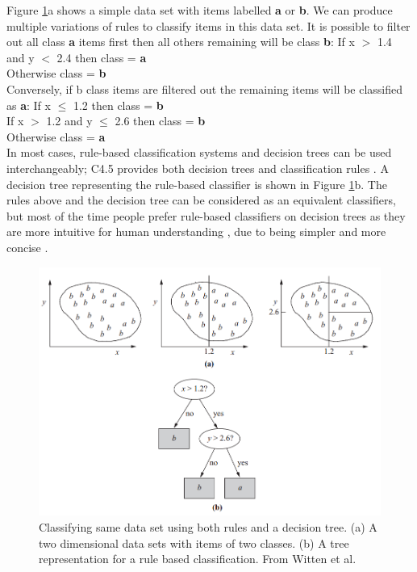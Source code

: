 Figure \ref{fig:ruleBased}a shows a simple data set with items labelled \textbf{a} or \textbf{b}. We can produce multiple variations of rules to classify items in this data set. It is possible to filter out all class \textbf{a} items first then all others remaining will be class \textbf{b}:
If x $>$ 1.4 and y $<$ 2.4 then class = \textbf{a}\\
Otherwise class = \textbf{b}\\

Conversely, if b class items are filtered out the remaining items will be classified as \textbf{a}:
If x $\leqslant$ 1.2 then class = \textbf{b} \\
If x $>$ 1.2 and y $\leqslant$ 2.6 then class = \textbf{b}\\
Otherwise class = \textbf{a}\\


In most cases, rule-based classification systems and decision trees can be used interchangeably; C4.5 provides both decision trees and classification rules \cite{Wu2008}. A decision tree representing the rule-based classifier is shown in Figure \ref{fig:ruleBased}b. The rules above and the decision tree can be considered as an equivalent classifiers, but most of the time people prefer rule-based classifiers on decision trees as they are more intuitive for human understanding \cite{Witten2011}, due to being simpler and more concise \cite{Wu2008}.


\begin{figure}[!h]
    \includegraphics[width=1\textwidth]{images/chapter2/rulebased.png}  
    \caption{Classifying same data set using both rules and a decision tree.
        (a) A two dimensional data sets with items of two classes.
        (b) A tree representation for a rule based classification.
        From Witten et al. \cite{Witten2011}}
    \label{fig:ruleBased}
\end{figure}

